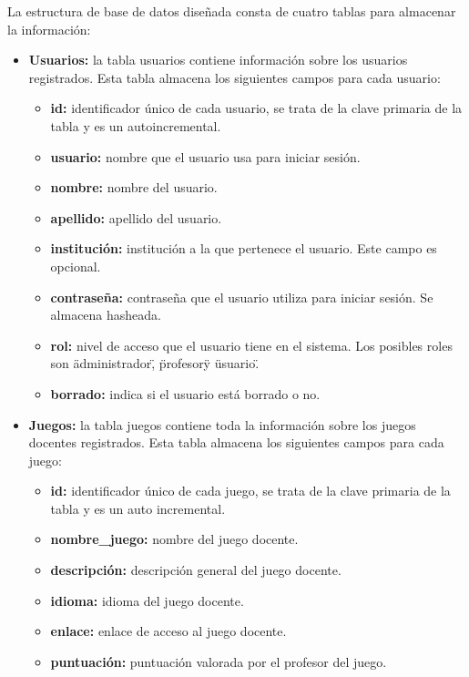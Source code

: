 La estructura de base de datos diseñada consta de cuatro tablas para almacenar la información:
\begin{itemize}
    \item \textbf{Usuarios:} la tabla usuarios contiene información sobre los usuarios registrados. Esta tabla almacena los siguientes campos para cada usuario:
        \begin{itemize}
        \tightlist
            \item \textbf{id:} identificador único de cada usuario, se trata de la clave primaria de la tabla y es un autoincremental.
            \item \textbf{usuario:} nombre que el usuario usa para iniciar sesión.
            \item \textbf{nombre:} nombre del usuario.
            \item \textbf{apellido:} apellido del usuario.
            \item \textbf{institución:} institución a la que pertenece el usuario. Este campo es opcional.
            \item \textbf{contraseña:} contraseña que el usuario utiliza para iniciar sesión. Se almacena hasheada. 
            \item \textbf{rol:} nivel de acceso que el usuario tiene en el sistema. Los posibles roles son \"administrador\", \"profesor\" y \"usuario\".
            \item \textbf{borrado:} indica si el usuario está borrado o no.
        \end{itemize}
    \item \textbf{Juegos:} la tabla juegos contiene toda la información sobre los juegos docentes registrados. Esta tabla almacena los siguientes campos para cada juego:
        \begin{itemize}
        \tightlist
            \item \textbf{id:} identificador único de cada juego, se trata de la clave primaria de la tabla y es un auto incremental.
            \item \textbf{nombre\_juego:} nombre del juego docente.
            \item \textbf{descripción:} descripción general del juego docente.
            \item \textbf{idioma:} idioma del juego docente.
            \item \textbf{enlace:} enlace de acceso al juego docente.
            \item \textbf{puntuación:} puntuación valorada por el profesor del juego.

\end{itemize}
\end{itemize}
